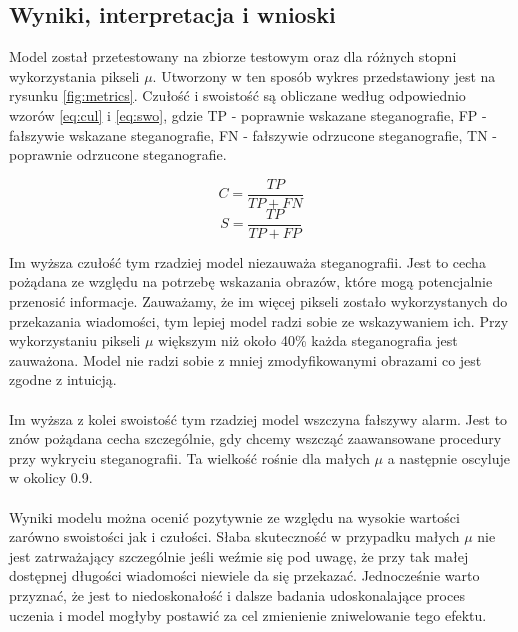 \documentclass[a4paper,12pt]{article}
\begin{document}
    \subsection{Wyniki, interpretacja i wnioski}
    Model został przetestowany na zbiorze testowym oraz dla różnych stopni wykorzystania pikseli $\mu$. Utworzony w ten sposób wykres przedstawiony jest na rysunku \ref{fig:metrics}. Czułość i swoistość są obliczane według odpowiednio wzorów \ref{eq:cul} i \ref{eq:swo}, gdzie TP - poprawnie wskazane steganografie, FP - fałszywie wskazane steganografie, FN - fałszywie odrzucone steganografie, TN - poprawnie odrzucone steganografie.

    \begin{equation}
        C = \frac{TP}{TP+FN}
        \label{eq:cul}
    \end{equation}
    \begin{equation}
    S = \frac{TP}{TP+FP}
        \label{eq:swo}
    \end{equation}

    Im wyższa czułość tym rzadziej model niezauważa steganografii. Jest to cecha pożądana ze względu na potrzebę wskazania obrazów, które mogą potencjalnie przenosić informacje. Zauważamy, że im więcej pikseli zostało wykorzystanych do przekazania wiadomości, tym lepiej model radzi sobie ze wskazywaniem ich. Przy wykorzystaniu pikseli $\mu$ większym niż około 40\% każda steganografia jest zauważona. Model nie radzi sobie z mniej zmodyfikowanymi obrazami co jest zgodne z intuicją. \\
    \\
    Im wyższa z kolei swoistość tym rzadziej model wszczyna fałszywy alarm. Jest to znów pożądana cecha szczególnie, gdy chcemy wszcząć zaawansowane procedury przy wykryciu steganografii. Ta wielkość rośnie dla małych $\mu$ a następnie oscyluje w okolicy 0.9. \\
    \\
    Wyniki modelu można ocenić pozytywnie ze względu na wysokie wartości zarówno swoistości jak i czułości. Słaba skuteczność w przypadku małych $\mu$ nie jest zatrważający szczególnie jeśli weźmie się pod uwagę, że przy tak małej dostępnej długości wiadomości niewiele da się przekazać. Jednocześnie warto przyznać, że jest to niedoskonałość i dalsze badania udoskonalające proces uczenia i model mogłyby postawić za cel zmienienie zniwelowanie tego efektu.
    
\end{document}
